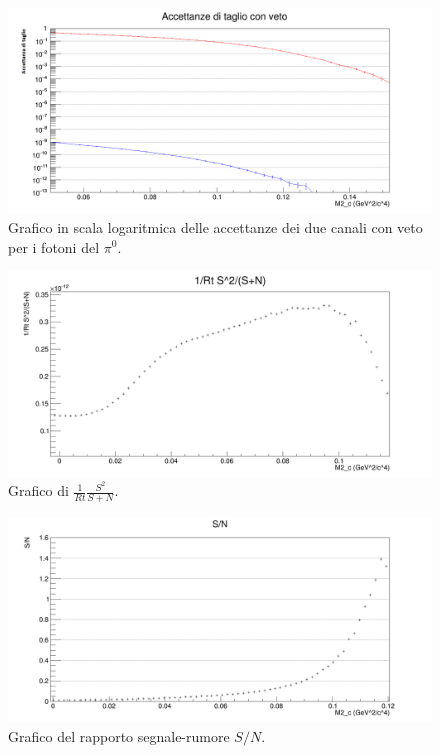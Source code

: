 \documentclass[8pt]{extarticle}
\begin{document}
 \begin{figure}
 \begin{center}
 	\includegraphics[scale=0.3]{acc_taglio_veto}
 	\caption{Grafico in scala logaritmica delle accettanze dei due canali con veto per i fotoni del $\pi^0$.}
 	\label{fig:acc_taglio_veto}
 \end{center}
 \end{figure}

 \begin{figure}
 \begin{center}
 	\includegraphics[scale=0.25]{acc_s2}
 	\caption{Grafico di $\frac{1}{Rt} \frac{S^2}{S+N}$.}
 	\label{fig:acc_s2}
 \end{center}
 \end{figure}
 
  \begin{figure}
 \begin{center}
 	\includegraphics[scale=0.25]{acc_sn}
 	\caption{Grafico del rapporto segnale-rumore $S/N$.}
 	\label{fig:acc_snratio}
 \end{center}
 \end{figure}
\end{document}
